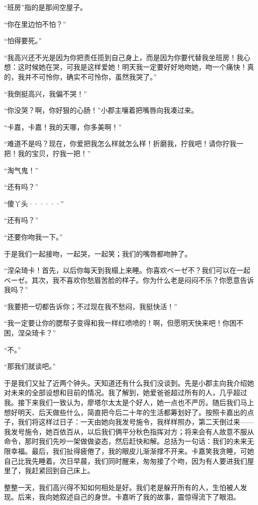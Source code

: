 \documentclass[12pt, UTF8]{ctexbook}
\begin{document}
\par “班房”指的是那间空屋子。
\par “你在里边怕不怕？”
\par “怕得要死。”
\par “我高兴还不光是因为你把责任揽到自己身上，而是因为你要代替我坐班房！我心想：这时候她在哭，可我是这样爱她！明天我一定要好好地吻她，吻一个痛快！真的，我并不可怜你，确实不可怜你，虽然我哭了。”
\par “我倒挺高兴，我偏不哭！”
\par “你没哭？啊，你好狠的心肠！”小郡主嚷着把嘴唇向我凑过来。
\par “卡嘉，卡嘉！我的天哪，你多美啊！”
\par “难道不是吗？现在，你爱把我怎么样就怎么样！折磨我，拧我吧！请你拧我一把！我的宝贝，拧我一把！”
\par “淘气鬼！”
\par “还有吗？”
\par “傻丫头······”
\par “还有吗？”
\par “还要你吻我一下。”
\par 于是我们一起接吻，一起哭，一起笑；我们的嘴唇都吻肿了。
\par “涅朵琦卡！首先，以后你每天到我榻上来睡。你喜欢ベーゼ不？我们可以在一起ベーゼ。其次，我不喜欢你愁眉苦脸的样子。你为什么老是闷闷不乐？你愿意告诉我吗？”
\par “我要把一切都告诉你；不过现在我不愁闷，我挺快活！”
\par “我一定要让你的腮帮子变得和我一样红喷喷的！啊，但愿明天快来吧！你困不困，涅朵琦卡？”
\par “不。”
\par “那我们就谈吧。”
\par 于是我们又扯了近两个钟头。天知道还有什么我们没谈到。先是小郡主向我介绍她对未来的全部设想和目前的情况。我了解到，她爱爸爸超过所有的人，几乎超过我。接下来我们一致认为，廖塔尔太太是个好人，她一点也不严厉。随后我们马上想好明天、后天做些什么，简直把今后二十年的生活都筹划好了。按照卡嘉出的点子，我们将这样过日子：一天由她向我发号施令，我样样照办，第二天倒过来——我发号施令，她百依百从，以后我们俩平分秋色指挥对方；将来会有人故意不服从命令，那时我们先吵一架做做姿态，然后赶快和解。总括为一句话：我们的未来无限幸福。最后，我们扯得疲倦了，我的眼皮儿渐渐撑不开来。卡嘉笑我贪睡，可她自己比我先睡着。次日早晨，我们同时醒来，匆匆接了个吻，因为有人要进我们屋里了，我赶紧回到自己床上。
\par 整整一天，我们高兴得不知如何相处是好。我们老是躲开所有的人，生怕被人发现。后来，我向她叙述自己的身世。卡嘉听了我的故事，震惊得流下了眼泪。
\end{document}

